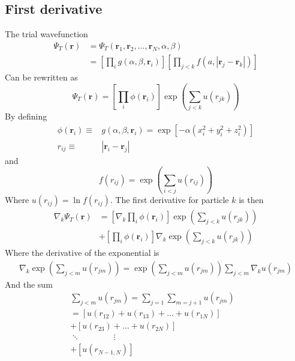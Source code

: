 \documentclass[
    a4paper, aps, twocolumn, floatfix, superscriptaddress,
    nofootinbib]{revtex4-1}
\begin{document}
\begin{appendices}
\section{First derivative}
The trial wavefunction \cite{project1}
\begin{align}
    \Psi_T(\boldsymbol{r}) &= \Psi_T(\boldsymbol{r}_1,\boldsymbol{r}_2,...,\boldsymbol{r}_N,\alpha,\beta) \\
    &= \left[\prod_i g(\alpha,\beta,\boldsymbol{r}_i)\right] \left[\prod_{j<k} f(a,|\boldsymbol{r}_j - \boldsymbol{r}_k|)\right]
\end{align}
Can be rewritten as 
\begin{equation}
    \Psi_T(\boldsymbol{r}) = \left[\prod_i \phi(\boldsymbol{r}_i)\right] \exp \left(\sum_{j<k} u(r_{jk})\right)
\end{equation}
By defining 
\begin{align*}
     \phi(\boldsymbol{r}_i) \equiv & g(\alpha, \beta, \boldsymbol{r}_i) =  \exp[-\alpha(x_i^2 + y_i^2 + z_i^2)]  \\
    r_{ij} \equiv& |\boldsymbol{r}_i - \boldsymbol{r}_j|
\end{align*}
and 
\begin{equation}
    f(r_{ij}) = \exp \left(\sum_{i<j} u(r_{ij})\right)
\end{equation}
Where $u(r_{ij}) = \ln{f(r_{ij})}$. 
The first derivative for particle $k$ is then 
\begin{align}
    \nabla_k \Psi_T(\boldsymbol{r}) &= \left[\nabla_k \prod_i \phi(\boldsymbol{r}_i)\right]\exp\left(\sum_{j<k} u(r_{jk})\right) \nonumber \\ 
    &+ \left[\prod_i \phi(\boldsymbol{r}_i)\right]\nabla_k \exp\left(\sum_{j<k} u(r_{jk})\right) 
\end{align}
Where the derivative of the exponential is
\begin{align}\label{exponential_deriv}
    \nabla_k \exp\left(\sum_{j<m} u(r_{jm})\right) = \exp\left(\sum_{j<m} u(r_{jm})\right)  \sum_{j < m} \nabla_k u(r_{jm}) 
\end{align}
And the sum 
\begin{align}
    \sum_{j<m} u(r_{jm}) =\sum_{j=1}\sum_{m=j+1} u(r_{jm})& \\
    = \left[u(r_{12})+u(r_{13})+...+u(r_{1N})\right]& \nonumber \\
    + \left[u(r_{23})+...+u(r_{2N})\right]& \nonumber \\
     \ddots \qquad \qquad \vdots \qquad& \nonumber \\
    +\left[u(r_{N-1,N})\right] \nonumber

\end{align}
\end{appendices}
\end{document}
